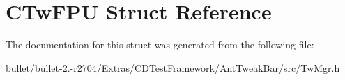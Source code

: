 \hypertarget{struct_c_tw_f_p_u}{\section{C\+Tw\+F\+P\+U Struct Reference}
\label{struct_c_tw_f_p_u}
}


The documentation for this struct was generated from the following file\+:\begin{DoxyCompactItemize}
\item 
bullet/bullet-\/2.-\/r2704/\+Extras/\+C\+D\+Test\+Framework/\+Ant\+Tweak\+Bar/src/Tw\+Mgr.\+h\end{DoxyCompactItemize}
